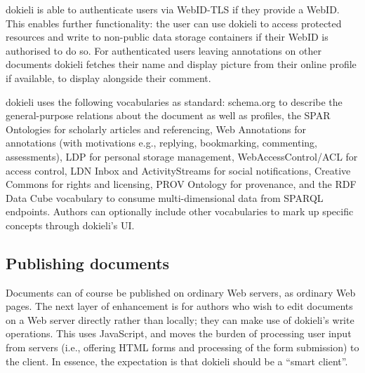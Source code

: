 \documentclass[a4paper]{llncs}
\begin{document}
                                    
\par dokieli is able to authenticate users via WebID-TLS if they provide a WebID. This enables further functionality: the user can use dokieli to access protected resources and write to non-public data storage containers if their WebID is authorised to do so. For authenticated users leaving annotations on other documents dokieli fetches their name and display picture from their online profile if available, to display alongside their comment. 

                                    
\par dokieli uses the following vocabularies as standard: \empty schema.org to describe the general-purpose relations about the document as well as profiles, the \empty SPAR Ontologies for scholarly articles and referencing, \empty Web Annotations for annotations (with motivations e.g., replying, bookmarking, commenting, assessments), \empty LDP for personal storage management, \empty WebAccessControl/\empty ACL for access control, \empty LDN Inbox and \empty ActivityStreams for social notifications, \empty Creative Commons for rights and licensing, \empty PROV Ontology for provenance, and the \empty RDF Data Cube vocabulary to consume multi-dimensional data from SPARQL endpoints. Authors can optionally include other vocabularies to mark up specific concepts through dokieli’s UI.
                                
                            

                            
                                \subsection{Publishing documents}
  \label{publishing-documents}

                                
                                    
\par Documents can of course be published on ordinary Web servers, as ordinary Web pages. The next layer of enhancement is for authors who wish to edit documents on a Web server directly rather than locally; they can make use of dokieli’s write operations. This uses JavaScript, and moves the burden of processing user input from servers (i.e., offering HTML forms and processing of the form submission) to the client.  In essence, the expectation is that dokieli should be a ``smart client''.
                                    
\end{document}
